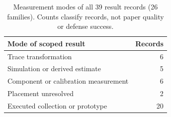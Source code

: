 \begin{table}[t]\centering\footnotesize
\caption{Measurement modes of all 39 result records (26 families). Counts classify records, not paper quality or defense success.}\label{tab:record-modes}
\begin{tabularx}{\columnwidth}{@{}Yr@{}}\toprule Mode of scoped result & Records\\\midrule
Trace transformation & 6\\
Simulation or derived estimate & 5\\
Component or calibration measurement & 6\\
Placement unresolved & 2\\
Executed collection or prototype & 20\\
\bottomrule\end{tabularx}\end{table}
